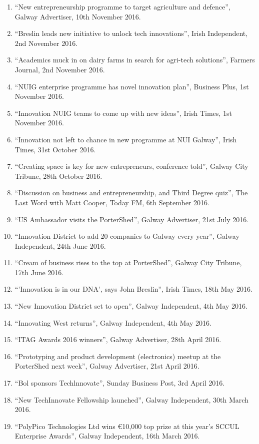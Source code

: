 \documentclass[10pt,a4paper]{res} %
\begin{document}
\begin{resume}
{\begin{enumerate}
\item ``New entrepreneurship programme to target agriculture and defence'', Galway Advertiser, 10th November 2016.
\item ``Breslin leads new initiative to unlock tech innovations'', Irish Independent, 2nd November 2016.
\item ``Academics muck in on dairy farms in search for agri-tech solutions'', Farmers Journal, 2nd November 2016.
\item ``NUIG enterprise programme has novel innovation plan'', Business Plus, 1st November 2016.
\item ``Innovation NUIG teams to come up with new ideas'', Irish Times, 1st November 2016.
\item ``Innovation not left to chance in new programme at NUI Galway'', Irish Times, 31st October 2016.
\item ``Creating space is key for new entrepreneurs, conference told'', Galway City Tribune, 28th October 2016.
\item ``Discussion on business and entrepreneurship, and Third Degree quiz'', The Last Word with Matt Cooper, Today FM, 6th September 2016.
\item ``US Ambassador visits the PorterShed'', Galway Advertiser, 21st July 2016.
\item ``Innovation District to add 20 companies to Galway every year'', Galway Independent, 24th June 2016.
\item ``Cream of business rises to the top at PorterShed'', Galway City Tribune, 17th June 2016.
\item ``'Innovation is in our DNA', says John Breslin'', Irish Times, 18th May 2016.
\item ``New Innovation District set to open'', Galway Independent, 4th May 2016.
\item ``Innovating West returns'', Galway Independent, 4th May 2016.
\item ``ITAG Awards 2016 winners'', Galway Advertiser, 28th April 2016.
\item ``Prototyping and product development (electronics) meetup at the PorterShed next week'', Galway Advertiser, 21st April 2016.
\item ``Bol sponsors Techlnnovate'', Sunday Business Post, 3rd April 2016.
\item ``New TechInnovate Fellowship launched'', Galway Independent, 30th March 2016.
\item ``PolyPico Technologies Ltd wins \euro{}10,000 top prize at this year's SCCUL Enterprise Awards'', Galway Independent, 16th March 2016.

\end{enumerate}}
\end{resume}
\end{document}
